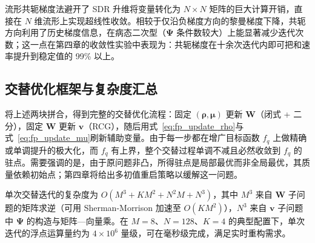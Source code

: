 流形共轭梯度法避开了 SDR 升维将变量转化为 $N \times N$ 矩阵的巨大计算开销，直接在 $N$ 维流形上实现超线性收敛。相较于仅沿负梯度方向的黎曼梯度下降，共轭方向利用了历史梯度信息，在病态二次型（$\bm{\Psi}$ 条件数较大）上能显著减少迭代次数；这一点在第四章的收敛性实验中表现为：共轭梯度在十余次迭代内即可把和速率提升到稳定值的 99\% 以上。

\subsection{交替优化框架与复杂度汇总}
\label{sec:ao_summary}

将上述两块拼合，得到完整的交替优化流程：固定 $(\bm{\rho},\bm{\mu})$ 更新 $\bm{W}$（闭式 + 二分），固定 $\bm{W}$ 更新 $\bm{v}$（RCG），随后用式~\eqref{eq:fp_update_rho}与式~\eqref{eq:fp_update_mu}刷新辅助变量。由于每一步都在增广目标函数 $f_q$ 上做精确或单调提升的极大化，而 $f_q$ 有上界，整个交替过程单调不减且必然收敛到 $f_q$ 的驻点。需要强调的是，由于原问题非凸，所得驻点是局部最优而非全局最优，其质量依赖初始点；第四章将给出多初值重启策略以缓解这一问题。

单次交替迭代的复杂度为 $O(M^3 + KM^2 + N^2 M + N^3)$，其中 $M^3$ 来自 $\bm{W}$ 子问题的矩阵求逆（可用 Sherman-Morrison 加速至 $O(KM^2)$），$N^3$ 来自 $\bm{v}$ 子问题中 $\bm{\Psi}$ 的构造与矩阵—向量乘。在 $M=8$、$N=128$、$K=4$ 的典型配置下，单次迭代的浮点运算量约为 $4\times 10^{6}$ 量级，可在毫秒级完成，满足实时重构需求。
